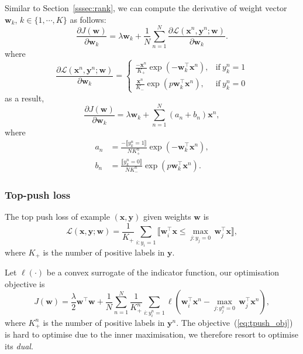 \documentclass[9pt]{extarticle}
\newcommand{\llb}{\llbracket}
\newcommand{\rrb}{\rrbracket}
\newcommand{\x}{\mathbf{x}}
\newcommand{\y}{\mathbf{y}}
\newcommand{\1}{\mathbf{1}}
\newcommand{\w}{\mathbf{w}}
\newcommand{\LCal}{\mathcal{L}}
\begin{document}
Similar to Section~\ref{sssec:rank}, we can compute the derivative of weight vector $\w_k, \, k \in \{1,\cdots,K\}$ as follows:
$$
\frac{\partial J(\w)} {\partial \w_k} = \lambda \w_k + \frac{1}{N} \sum_{n=1}^N \frac{\partial \LCal(\x^n, \y^n; \w)} {\partial \w_k}.
$$
where
\begin{equation}
\frac{\partial \LCal(\x^n, \y^n; \w)} {\partial \w_k} =
\begin{cases}
\frac{-\x^n}{K_+} \exp(-\w_k^\top \x^n),  & \text{if} \ y_k^n=1 \\
\frac{ \x^n}{K_-} \exp(p\w_k^\top \x^n),  & \text{if} \ y_k^n=0
\end{cases}
\end{equation}
as a result,
\begin{equation}
\label{eq:grad_pnorm}
\frac{\partial J(\w)} {\partial \w_k} = \lambda \w_k + \sum_{n=1}^N (a_n + b_n) \x^n,
\end{equation}
where
\begin{align*}
a_n &= \frac{-\llb y_k^n=1 \rrb} {N K_+^n} \exp( -\w_k^\top \x^n), \\
b_n &= \frac{ \llb y_k^n=0 \rrb} {N K_-^n} \exp(p \w_k^\top \x^n).
\end{align*}



\subsubsection{Top-push loss}
\label{sssec:tpush}

The top push loss of example $(\x, \y)$ given weights $\w$ is
\begin{equation}
\label{eq:tpush_loss}
\LCal(\x, \y; \w) = \frac{1}{K_+} \sum_{i:y_i=1} \llb \w_i^\top \x \le \underset{j:y_j=0}{\max} \, \w_j^\top \x \rrb,
\end{equation}
where $K_+$ is the number of positive labels in $\y$.

Let $\ell(\cdot)$ be a convex surrogate of the indicator function, our optimisation objective is
\begin{equation}
\label{eq:tpush_obj}
J(\w) = \frac{\lambda}{2} \w^\top \w + \frac{1}{N} \sum_{n=1}^N 
        \frac{1}{K_+^n} \sum_{i:y_i^n=1} \ell \left( \w_i^\top \x^n - \underset{j:y_j^n=0}{\max} \, \w_j^\top \x^n \right),
\end{equation}
where $K_+^n$ is the number of positive labels in $\y^n$.
The objective~(\ref{eq:tpush_obj}) is hard to optimise due to the inner maximisation,
we therefore resort to optimise its \emph{dual}.
\end{document}
